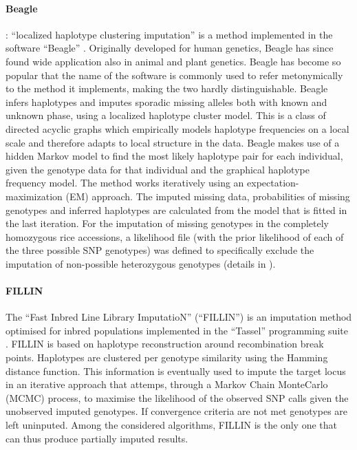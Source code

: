\paragraph{Beagle}
\label{par:Beagle}
: ``localized haplotype clustering imputation'' is a method implemented in the software ``Beagle'' \cite{browning_rapid_2007}. Originally developed for human genetics, Beagle has since found wide application also in animal and plant genetics. Beagle has become so popular that the name of the software is commonly used to refer metonymically to the method it implements, making the two hardly distinguishable. Beagle infers haplotypes and imputes sporadic missing alleles both with known and unknown phase, using a localized haplotype cluster model. This is a class of directed acyclic graphs which empirically models haplotype frequencies on a local scale and therefore adapts to local structure in the data. Beagle makes use of a hidden Markov model to find the most likely haplotype pair for each individual, given the genotype data for that individual and the graphical haplotype frequency model. The method works iteratively using an expectation-maximization (EM) approach. The imputed missing data, probabilities of missing genotypes and inferred haplotypes are calculated from the model that is fitted in the last iteration. For the imputation of missing genotypes in the completely homozygous rice accessions, a likelihood file (with the prior likelihood of each of the three possible SNP genotypes) was defined to specifically exclude the imputation of non-possible heterozygous genotypes (details in \cite{beagle3_manual}).

\paragraph{FILLIN}
The ``Fast Inbred Line Library ImputatioN'' (``FILLIN'') is an imputation method optimised for inbred populations implemented in the ``Tassel'' programming suite \cite{swarts_novel_2014}. FILLIN is based on haplotype reconstruction around recombination break points. Haplotypes are clustered per genotype similarity using the Hamming distance function. This information is eventually used to impute the target locus in an iterative approach that attemps, through a Markov Chain MonteCarlo (MCMC) process, to maximise the likelihood of the observed SNP calls given the unobserved imputed genotypes. If convergence criteria are not met genotypes are left uninputed. Among the considered algorithms, FILLIN is the only one that can thus produce partially imputed results.

